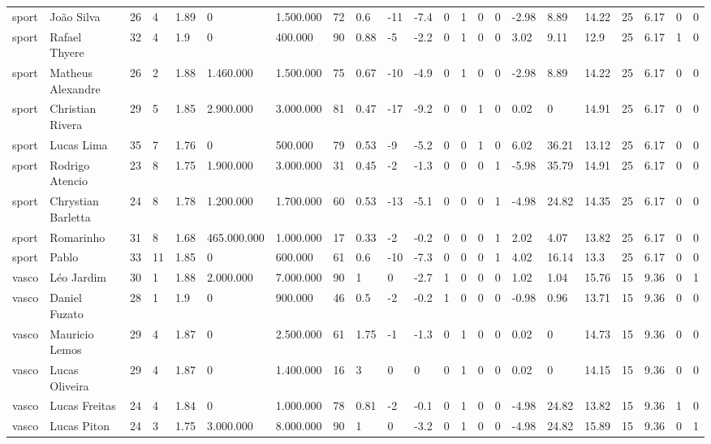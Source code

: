 \begin{longtable}{llllllllllllllllllllll}
sport & João Silva & 26 & 4 & 1.89 & 0 & 1.500.000 & 72 & 0.6 & -11 & -7.4 & 0 & 1 & 0 & 0 & -2.98 & 8.89 & 14.22 & 25 & 6.17 & 0 & 0 \\
sport & Rafael Thyere & 32 & 4 & 1.9 & 0 & 400.000 & 90 & 0.88 & -5 & -2.2 & 0 & 1 & 0 & 0 & 3.02 & 9.11 & 12.9 & 25 & 6.17 & 1 & 0 \\
sport & Matheus Alexandre & 26 & 2 & 1.88 & 1.460.000 & 1.500.000 & 75 & 0.67 & -10 & -4.9 & 0 & 1 & 0 & 0 & -2.98 & 8.89 & 14.22 & 25 & 6.17 & 0 & 0 \\
sport & Christian Rivera & 29 & 5 & 1.85 & 2.900.000 & 3.000.000 & 81 & 0.47 & -17 & -9.2 & 0 & 0 & 1 & 0 & 0.02 & 0 & 14.91 & 25 & 6.17 & 0 & 0 \\
sport & Lucas Lima & 35 & 7 & 1.76 & 0 & 500.000 & 79 & 0.53 & -9 & -5.2 & 0 & 0 & 1 & 0 & 6.02 & 36.21 & 13.12 & 25 & 6.17 & 0 & 0 \\
sport & Rodrigo Atencio & 23 & 8 & 1.75 & 1.900.000 & 3.000.000 & 31 & 0.45 & -2 & -1.3 & 0 & 0 & 0 & 1 & -5.98 & 35.79 & 14.91 & 25 & 6.17 & 0 & 0 \\
sport & Chrystian Barletta & 24 & 8 & 1.78 & 1.200.000 & 1.700.000 & 60 & 0.53 & -13 & -5.1 & 0 & 0 & 0 & 1 & -4.98 & 24.82 & 14.35 & 25 & 6.17 & 0 & 0 \\
sport & Romarinho & 31 & 8 & 1.68 & 465.000.000 & 1.000.000 & 17 & 0.33 & -2 & -0.2 & 0 & 0 & 0 & 1 & 2.02 & 4.07 & 13.82 & 25 & 6.17 & 0 & 0 \\
sport & Pablo & 33 & 11 & 1.85 & 0 & 600.000 & 61 & 0.6 & -10 & -7.3 & 0 & 0 & 0 & 1 & 4.02 & 16.14 & 13.3 & 25 & 6.17 & 0 & 0 \\
vasco & Léo Jardim & 30 & 1 & 1.88 & 2.000.000 & 7.000.000 & 90 & 1 & 0 & -2.7 & 1 & 0 & 0 & 0 & 1.02 & 1.04 & 15.76 & 15 & 9.36 & 0 & 1 \\
vasco & Daniel Fuzato & 28 & 1 & 1.9 & 0 & 900.000 & 46 & 0.5 & -2 & -0.2 & 1 & 0 & 0 & 0 & -0.98 & 0.96 & 13.71 & 15 & 9.36 & 0 & 0 \\
vasco & Mauricio Lemos & 29 & 4 & 1.87 & 0 & 2.500.000 & 61 & 1.75 & -1 & -1.3 & 0 & 1 & 0 & 0 & 0.02 & 0 & 14.73 & 15 & 9.36 & 0 & 0 \\
vasco & Lucas Oliveira & 29 & 4 & 1.87 & 0 & 1.400.000 & 16 & 3 & 0 & 0 & 0 & 1 & 0 & 0 & 0.02 & 0 & 14.15 & 15 & 9.36 & 0 & 0 \\
vasco & Lucas Freitas & 24 & 4 & 1.84 & 0 & 1.000.000 & 78 & 0.81 & -2 & -0.1 & 0 & 1 & 0 & 0 & -4.98 & 24.82 & 13.82 & 15 & 9.36 & 1 & 0 \\
vasco & Lucas Piton & 24 & 3 & 1.75 & 3.000.000 & 8.000.000 & 90 & 1 & 0 & -3.2 & 0 & 1 & 0 & 0 & -4.98 & 24.82 & 15.89 & 15 & 9.36 & 0 & 1 \\

\end{longtable}
